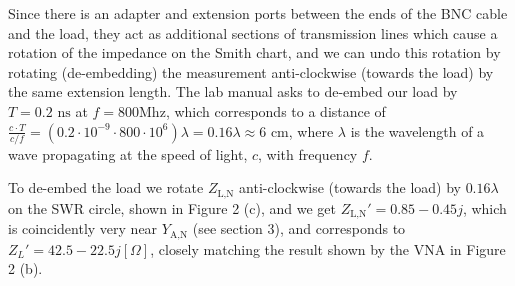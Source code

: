 \documentclass[10pt]{article}
\begin{document}
Since there is an adapter and extension ports between the ends of the BNC cable and the load, they act as 
additional sections of transmission lines which cause a rotation of the impedance on the Smith chart, and 
we can undo this rotation by rotating (de-embedding) the measurement anti-clockwise (towards the load) by the same 
extension length. The lab manual asks to de-embed our load by $T = 0.2 \text{ ns}$ at $f=800\text{Mhz}$, which corresponds 
to a distance of $\frac{c\cdot T}{c/f} = (0.2\cdot10^{-9}\cdot 800\cdot 10^{6}) \lambda = 0.16\lambda \approx 6\text{ cm}$, 
where $\lambda$ is the wavelength of a wave propagating at the speed of light, $c$, with frequency $f$.

To de-embed the load we rotate $Z_\text{L,N}$ anti-clockwise (towards the load) by $0.16\lambda$ on the SWR circle, 
shown in Figure 2 (c), and we get $Z_\text{L,N}' = 0.85 - 0.45j$, which is coincidently very near $Y_\text{A,N}$ 
(see section 3), and corresponds to $Z_L' = 42.5 - 22.5j [\Omega]$, closely matching the result shown by the VNA 
in Figure 2 (b).
\end{document}
